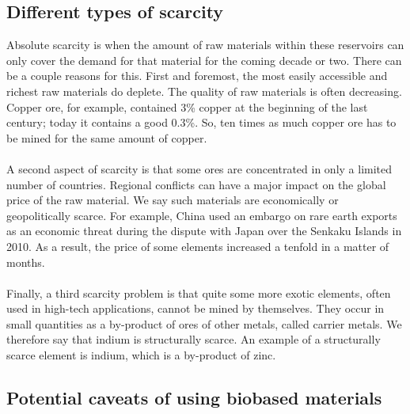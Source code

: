 \documentclass[../summary.tex]{subfiles}
\begin{document}
	\subsection{Different types of scarcity}
	
	Absolute scarcity is when the amount of raw materials within these reservoirs can only cover the demand for that material for the coming decade or two. There can be a couple reasons for this. First and foremost, the most easily accessible and richest raw materials do deplete. The quality of raw materials is often decreasing. Copper ore, for example, contained 3\% copper at the beginning of the last century; today it contains a good 0.3\%. So, ten times as much copper ore has to be mined for the same amount of copper. 
	\\\\
	A second aspect of scarcity is that some ores are concentrated in only a limited number of countries. Regional conflicts can have a major impact on the global price of the raw material. We say such materials are economically or geopolitically scarce. For example, China used an embargo on rare earth exports as an economic threat during the dispute with Japan over the Senkaku Islands in 2010. As a result, the price of some elements increased a tenfold in a matter of months.
	\\\\
	Finally, a third scarcity problem is that quite some more exotic elements, often used in high-tech applications, cannot be mined by themselves. They occur in small quantities as a by-product of ores of other metals, called carrier metals. We therefore say that indium is structurally scarce. An example of a structurally scarce element is indium, which is a by-product of zinc.
	
	\subsection{Potential caveats of using biobased materials}
	
\end{document}
